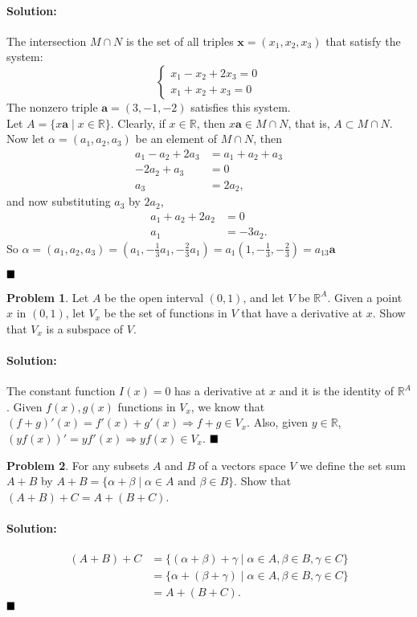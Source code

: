 \documentclass[]{article}
\newcommand{\RR}{\mathbb{R}}
\theoremstyle{definition}
\newtheorem{problem}{Problem}
\newenvironment{solution}{\paragraph{Solution:}}{\hfill$\blacksquare \\$}
\begin{document}
\begin{solution}
The intersection $M \cap N$ is the set of all triples $\mathbf{x} = (x_1, x_2, x_3)$ that satisfy the system:
\[
\begin{cases}
	x_1 - x_2 + 2x_3 = 0 \\
	x_1 + x_2 + x_3 = 0
\end{cases}
\]
The nonzero triple $\mathbf{a} = (3,-1,-2)$ satisfies this system. \\ 
Let $ A = \{x\mathbf{a} \mid x \in \RR\}$. Clearly, if $x \in \RR$, then $x\mathbf{a} \in M \cap N$, that is, $A \subset M \cap N$.
Now let $\alpha = (a_1, a_2, a_3)$ be an element of $M \cap N$, then
\begin{align*}
a_1 - a_2 + 2a_3 &= a_1 + a_2 + a_3	\\
-2a_2 + a_3 &= 0 \\
a_3 &= 2a_2, 
\end{align*}
and now substituting $a_3$ by $2a_2$,
\begin{align*}
a_1 + a_2 + 2a_2 &= 0 \\
a_1 &= -3a_2.	
\end{align*}
So $\alpha = (a_1, a_2, a_3) = (a_1, - \frac{1}{3}a_1, -\frac{2}{3}a_1) = a_1(1, - \frac{1}{3}, - \frac{2}{3}) = a_13\mathbf{a}$

\end{solution}
\begin{problem}
Let $A$ be the open interval $(0,1)$, and let $V$ be $\RR^A$.
Given a point $x$ in $(0,1)$, let $V_x$ be the set of functions in $V$ that have a derivative at $x$.
Show that $V_x$ is a subspace of $V$.
\end{problem}
\begin{solution}
The constant function $I(x) = 0$ has a derivative at $x$ and it is the identity of $\RR^A$. Given $f(x),g(x)$	
functions in $V_x$, we know that $(f+g)'(x) = f'(x) + g'(x) \Rightarrow f+g \in V_x$. Also, given $y \in \RR$, $(yf(x))' = yf'(x) \Rightarrow yf(x) \in V_x$.
\end{solution}
\begin{problem}
 For any subsets $A$ and $B$ of a vectors space $V$ we define the set sum $A+B$ by $A+B = \{\alpha + \beta \mid \alpha \in A \text{ and } \beta \in B\}$.
 Show that $(A+B)+C = A+(B+C)$.	
\end{problem}
\begin{solution}
\begin{align*}
(A+B)+C &= \{ (\alpha + \beta) + \gamma \mid \alpha \in A, \beta \in B, \gamma \in C\} \\
&= \{ \alpha + (\beta + \gamma) \mid \alpha \in A, \beta \in B, \gamma \in C\} \\
&= A + (B+C).	
\end{align*}
\end{solution}
\end{document}
